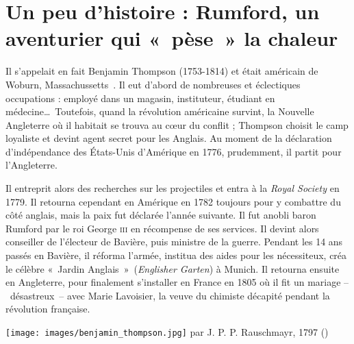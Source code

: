 \atstartofhistorysection
\section[Un peu d’histoire : l’aventurier Rumford]{Un peu d’histoire :\onlyamphibook{\\} Rumford, un aventurier qui «~pèse~» la chaleur}
\label{ch_histoire_rumford_depondt}


	Il s'appelait en fait Benjamin Thompson (1753-1814) et était américain de Woburn, Massachussetts~\cite{millar1996}. Il eut d'abord de nombreuses et éclectiques occupations : employé dans un magasin, instituteur, étudiant en médecine…\ Toutefois, quand la révolution américaine survint, la Nouvelle Angleterre où il habitait se trouva au cœur du conflit ; Thompson choisit le camp loyaliste et devint agent secret pour les Anglais. Au moment de la déclaration d'indépendance des États-Unis d'Amérique en 1776, prudemment, il partit pour l'Angleterre.

	Il entreprit alors des recherches sur les projectiles et entra à la \textit{Royal Society} en 1779. Il retourna cependant en Amérique en 1782 toujours pour y combattre du côté anglais, mais la paix fut déclarée l'année suivante. Il fut anobli baron Rumford par le roi George \textsc{iii} en récompense de ses services. Il devint alors conseiller de l'électeur de Bavière, puis ministre de la guerre. Pendant les 14 ans passés en Bavière, il réforma l'armée, institua des aides pour les nécessiteux, créa le célèbre «~Jardin Anglais~»\ (\textit{Englisher Garten}) à Munich. Il retourna ensuite en Angleterre, pour finalement s'installer en France en 1805 où il fit un mariage --\ désastreux\ -- avec Marie Lavoisier, la veuve du chimiste décapité pendant la révolution française.
	
	\onlyamphibook{\begin{figure}[htc]}
		\begin{center}
			\texttt{[image: images/benjamin\_thompson.jpg]}
			{ par  J. P. P. Rauschmayr, 1797 (\pd)}\onlyframabook{\vspace{-1.5\intextsep}}
			\label{fig_benjamin_thompson}
		\end{center}
	\onlyamphibook{\end{figure}}
	\onlyframabook{\end{wrapfigure}}

